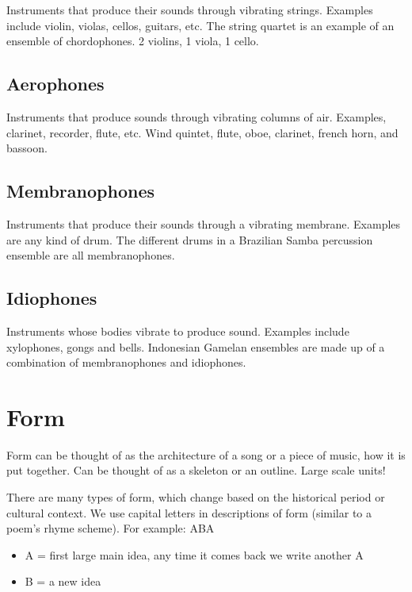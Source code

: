 \documentclass[12pt, a4paper]{report}
\begin{document}
  Instruments that produce their sounds through vibrating strings. Examples include violin, violas, cellos, guitars, etc. The string quartet is an example of an ensemble of chordophones. 2 violins, 1 viola, 1 cello.

  \subsection{Aerophones}

  Instruments that produce sounds through vibrating columns of air. Examples, clarinet, recorder, flute, etc. Wind quintet, flute, oboe, clarinet, french horn, and bassoon.

  \subsection{Membranophones}

  Instruments that produce their sounds through a vibrating membrane. Examples are any kind of drum. The different drums in a Brazilian Samba percussion ensemble are all membranophones.

  \subsection{Idiophones}

  Instruments whose bodies vibrate to produce sound. Examples include xylophones, gongs and bells. Indonesian Gamelan ensembles are made up of a combination of membranophones and idiophones.

  \newpage

  \section{Form}

  Form can be thought of as the architecture of a song or a piece of music, how it is put together. Can be thought of as a skeleton or an outline. Large scale units!

  There are many types of form, which change based on the historical period or cultural context. We use capital letters in descriptions of form (similar to a poem's rhyme scheme). For example: ABA

  \begin{itemize}
    \item A = first large main idea, any time it comes back we write another A
    \item B = a new idea
  \end{itemize}
\end{document}
